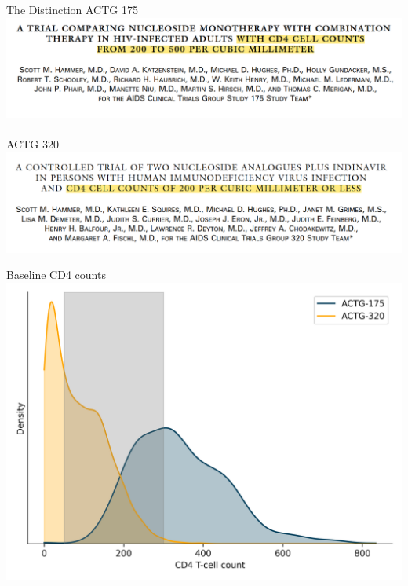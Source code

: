 \documentclass{beamer}
\begin{document}
\begin{frame}{The Distinction}
	\centering
	ACTG 175
	\includegraphics[scale=0.35]{images/actg175.png}\\~\\
	ACTG 320
	\includegraphics[scale=0.35]{images/actg320.png}
\end{frame}

\begin{frame}{Baseline CD4 counts}
	\centering
	\includegraphics[scale=0.5]{images/cd4_by_study.png}	
\end{frame}
\end{document}
